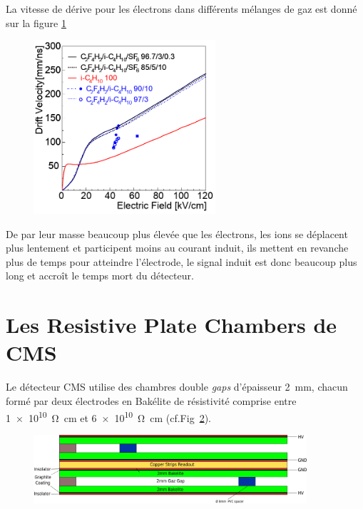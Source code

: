 La vitesse de dérive pour les électrons dans différents mélanges de gaz est donné sur la figure \ref{drift} \cite{Riegler:570462}

\begin{figure}[ht!]
	\centering
	\includegraphics[width=0.60\textwidth]{RPC/drift.png}
	\label{drift}
\end{figure}

De par leur masse beaucoup plus élevée que les électrons, les ions se déplacent plus lentement et participent moins au courant induit, ils mettent en revanche plus de temps pour atteindre l'électrode, le signal induit est donc beaucoup plus long et accroît le temps mort du détecteur.

\section{Les Resistive Plate Chambers de CMS}

Le détecteur CMS utilise des chambres double \textit{gaps} d'épaisseur \SI{2}{\milli\meter}, chacun formé par deux électrodes en Bakélite de résistivité comprise entre \SI{1e10}{\ohm\centi\meter} et \SI{6e10}{\ohm\centi\meter} (cf.Fig~\ref{cmsrpc}). 

\begin{figure}[ht!]
	\centering
	\includegraphics[width=0.90\textwidth]{RPC/CMSRPC.png}
	\label{cmsrpc}
\end{figure}


